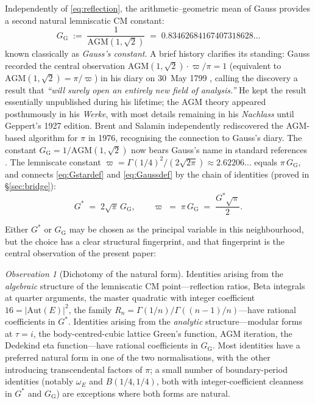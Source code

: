 \documentclass[11pt]{article}
\theoremstyle{definition}
\theoremstyle{remark}
\newtheorem*{observation}{Observation}
\newcommand{\Gs}{G^{*}}
\newcommand{\GG}{G_{\!\scriptscriptstyle\mathrm{G}}}
\newcommand{\AGM}{\mathrm{AGM}}
\newcommand{\Aut}{\mathrm{Aut}}
\begin{document}
Independently of \eqref{eq:reflection}, the arithmetic--geometric mean of
Gauss provides a second natural lemniscatic CM constant:
\begin{equation}
\boxed{\;\GG \;:=\; \frac{1}{\AGM(1,\sqrt{2})} \;=\; 0.83462684167407318628\ldots\;} \label{eq:Gaussdef}
\end{equation}
known classically as \emph{Gauss's constant}. A brief history clarifies
its standing: Gauss recorded the central observation
$\AGM(1, \sqrt 2)\cdot \varpi/\pi = 1$ (equivalent to
$\AGM(1, \sqrt 2) = \pi/\varpi$) in his
diary on 30~May 1799 \cite[Werke III, p.~370]{gauss-werke}, calling the
discovery a result that \emph{``will surely open an entirely new field of
analysis.''} He kept the result essentially unpublished during his lifetime;
the AGM theory appeared posthumously in his \emph{Werke}, with most details
remaining in his \emph{Nachlass} until Geppert's 1927 edition. Brent
\cite{brent1976} and Salamin \cite{salamin1976} independently rediscovered
the AGM-based algorithm for $\pi$ in 1976, recognising the connection to
Gauss's diary. The constant $\GG = 1/\AGM(1, \sqrt 2)$ now bears Gauss's
name in standard references \cite{mathworld-gauss-constant, finch-constants}. The lemniscate constant
$\varpi = \Gamma(1/4)^2/(2\sqrt{2\pi}) \approx 2.62206\ldots$ equals
$\pi\,\GG$, and connects \eqref{eq:Gstardef} and \eqref{eq:Gaussdef} by
the chain of identities (proved in \S\ref{sec:bridge}):
\begin{equation}
\Gs \;=\; 2\sqrt{\pi}\,\GG, \qquad
\varpi \;=\; \pi\,\GG \;=\; \frac{\Gs\sqrt\pi}{2}.
\label{eq:bridge}
\end{equation}

Either $\Gs$ or $\GG$ may be chosen as the principal variable in this
neighbourhood, but the choice has a clear structural fingerprint, and that
fingerprint is the central observation of the present paper:

\begin{observation}[Dichotomy of the natural form]\label{obs:dichotomy}
Identities arising from the \emph{algebraic} structure of the lemniscatic CM
point---reflection ratios, Beta integrals at quarter arguments, the master
quadratic with integer coefficient $16 = |\Aut(E)|^2$, the family $R_n =
\Gamma(1/n)/\Gamma((n-1)/n)$---have rational coefficients in $\Gs$. Identities
arising from the \emph{analytic} structure---modular forms at $\tau = i$, the
body-centred-cubic lattice Green's function, AGM iteration, the Dedekind eta
function---have rational coefficients in $\GG$. Most identities have a
preferred natural form in one of the two normalisations, with the other
introducing transcendental factors of $\pi$; a small number of
boundary-period identities (notably $\omega_E$ and $B(1/4,1/4)$, both
with integer-coefficient cleanness in $\Gs$ and $\GG$) are exceptions
where both forms are natural.
\end{observation}
\end{document}

